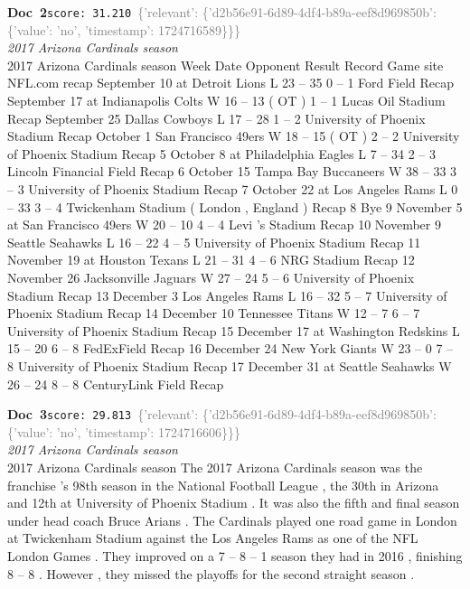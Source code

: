 \documentclass[a4paper,11pt]{article}
\begin{document}
\begin{docenv}
{\footnotesize\textcolor{doccolor}{\textbf{Doc~2}}}\hfill{\tiny\texttt{score:~31.210}}\ {\tiny\textcolor{gray}{\{'relevant': \{'d2b56e91-6d89-4df4-b89a-eef8d969850b': \{'value': 'no', 'timestamp': 1724716589\}\}\}}}\\[3pt]
{\small\textit{2017 Arizona Cardinals season}}\\[2pt]
\vspace{2pt}
{\footnotesize 2017 Arizona Cardinals season
Week Date Opponent Result Record Game site NFL.com recap September 10 at Detroit Lions L 23 -- 35 0 -- 1 Ford Field Recap September 17 at Indianapolis Colts W 16 -- 13 ( OT ) 1 -- 1 Lucas Oil Stadium Recap September 25 Dallas Cowboys L 17 -- 28 1 -- 2 University of Phoenix Stadium Recap October 1 San Francisco 49ers W 18 -- 15 ( OT ) 2 -- 2 University of Phoenix Stadium Recap 5 October 8 at Philadelphia Eagles L 7 -- 34 2 -- 3 Lincoln Financial Field Recap 6 October 15 Tampa Bay Buccaneers W 38 -- 33 3 -- 3 University of Phoenix Stadium Recap 7 October 22 at Los Angeles Rams L 0 -- 33 3 -- 4 Twickenham Stadium ( London , England ) Recap 8 Bye 9 November 5 at San Francisco 49ers W 20 -- 10 4 -- 4 Levi 's Stadium Recap 10 November 9 Seattle Seahawks L 16 -- 22 4 -- 5 University of Phoenix Stadium Recap 11 November 19 at Houston Texans L 21 -- 31 4 -- 6 NRG Stadium Recap 12 November 26 Jacksonville Jaguars W 27 -- 24 5 -- 6 University of Phoenix Stadium Recap 13 December 3 Los Angeles Rams L 16 -- 32 5 -- 7 University of Phoenix Stadium Recap 14 December 10 Tennessee Titans W 12 -- 7 6 -- 7 University of Phoenix Stadium Recap 15 December 17 at Washington Redskins L 15 -- 20 6 -- 8 FedExField Recap 16 December 24 New York Giants W 23 -- 0 7 -- 8 University of Phoenix Stadium Recap 17 December 31 at Seattle Seahawks W 26 -- 24 8 -- 8 CenturyLink Field Recap}
\end{docenv}
\begin{docenv}
{\footnotesize\textcolor{doccolor}{\textbf{Doc~3}}}\hfill{\tiny\texttt{score:~29.813}}\ {\tiny\textcolor{gray}{\{'relevant': \{'d2b56e91-6d89-4df4-b89a-eef8d969850b': \{'value': 'no', 'timestamp': 1724716606\}\}\}}}\\[3pt]
{\small\textit{2017 Arizona Cardinals season}}\\[2pt]
\vspace{2pt}
{\footnotesize 2017 Arizona Cardinals season
The 2017 Arizona Cardinals season was the franchise 's 98th season in the National Football League , the 30th in Arizona and 12th at University of Phoenix Stadium . It was also the fifth and final season under head coach Bruce Arians . The Cardinals played one road game in London at Twickenham Stadium against the Los Angeles Rams as one of the NFL London Games . They improved on a 7 -- 8 -- 1 season they had in 2016 , finishing 8 -- 8 . However , they missed the playoffs for the second straight season .}
\end{docenv}
\end{document}

